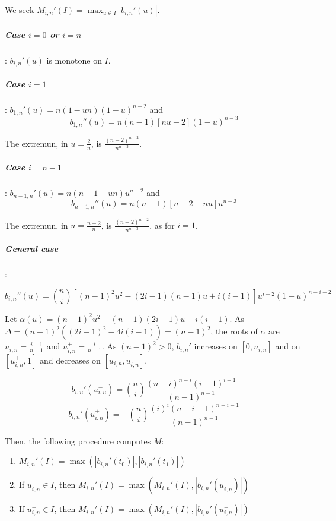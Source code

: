\documentclass {article}
\newcommand\bernstein[2]{b_{#1, #2}}
\begin{document}
We seek $ M_{i,n}' (I) = \max_{u \in I} |\bernstein{i}{n}' (u)| $.

\subparagraph{Case $i = 0$ or $i = n$}: $\bernstein{i}{n}' (u)$ is monotone on $I$.

\subparagraph{Case $i = 1$}:
$ \bernstein{1}{n}' (u) = n (1 - u n) (1-u)^{n-2} $
and
$$
\bernstein{1}{n}'' (u) = n (n-1) \left[ n u - 2 \right] (1-u)^{n-3}
$$

The extremun, in $u = \frac{2}{n} $, is $\frac{(n-2)^{n-2}}{n^{n-3}}$.

\subparagraph{Case $i = n-1$}:
$ \bernstein{n-1}{n}' (u) = n (n - 1 - u n) u^{n-2} $
and
$$
\bernstein{n-1}{n}'' (u) = n (n-1) \left[ n-2 - n u \right] u^{n-3}
$$

The extremun, in $u = \frac{n-2}{n} $, is $\frac{(n-2)^{n-2}}{n^{n-3}}$, as for $i = 1$.

\subparagraph{General case}:

$$
\bernstein{i}{n}'' (u) = { n \choose i } \left[ (n-1)^2 u^2 - (2 i - 1) (n - 1) u + i (i-1) \right] u^{i-2} (1-u)^{n-i-2}
$$

Let $ \alpha(u) = (n-1)^2 u^2 - (n - 1)(2 i - 1) u + i (i-1) $.
As $\Delta = (n-1)^2 ( (2i-1)^2 - 4 i (i - 1)) = (n-1)^2$,
the roots of $\alpha$ are $ u^-_{i,n} = \frac{i-1}{n-1} $ and $ u^+_{i,n} = \frac{i}{n-1}$.
As $(n-1)^2 > 0$, $\bernstein{i}{n}'$ increases on $\left[ 0, u^-_{i,n} \right]$ and on $\left[ u^+_{i,n}, 1\right]$
and decreases on $\left[ u^-_{i,n}, u^+_{i,n} \right]$.

$$
\bernstein{i}{n}' (u^-_{i,n}) = { n \choose i } \frac{(n-i)^{n-i} (i-1)^{i-1}}{(n-1)^{n-1}}
$$
$$
\bernstein{i}{n}' (u^+_{i,n}) = - { n \choose i } \frac{(i)^i (n-i-1)^{n-i-1}}{(n-1)^{n-1}}
$$

Then, the following procedure computes $M$:

\begin{enumerate}
  \item $ M_{i,n}'(I) = \max(|\bernstein{i}{n}' (t_0)|,|\bernstein{i}{n}' (t_1)|) $
  \item If $u^+_{i,n} \in I$, then $ M_{i,n}'(I) = \max(M_{i,n}'(I), |\bernstein{i}{n}' (u^+_{i,n})|)$
  \item If $u^-_{i,n} \in I$, then $ M_{i,n}'(I) = \max(M_{i,n}'(I), |\bernstein{i}{n}' (u^-_{i,n})|)$
\end{enumerate}
\end{document}
